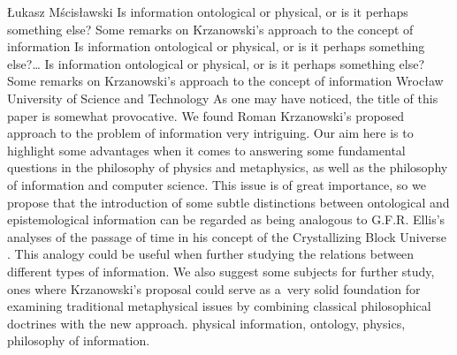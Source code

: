 \begin{artengenv}{Łukasz Mścisławski}
	{Is information ontological or physical, or is it perhaps something else? Some remarks on Krzanowski's approach to the concept of information}
	{Is information ontological or physical, or is it perhaps something else?\ldots}
	{Is information ontological or physical, or is it perhaps something else? Some remarks on Krzanowski's approach to the concept of information}
	{Wrocław University of Science and Technology}
	{As one may have noticed, the title of this paper is somewhat provocative. We found Roman Krzanowski's
	\parencites*[][]{krzanowski_does_2020}[][]{krzanowski_what_2020}[][]{krzanowski_why_2020}[][]{krzanowski_ontological_2022} %
	 proposed approach to the problem of information very intriguing. Our aim here is to highlight some advantages when it comes to answering some fundamental questions in the philosophy of physics and metaphysics, as well as the philosophy of information and computer science. This issue is of great importance, so we propose that the introduction of some subtle distinctions between ontological and epistemological information can be regarded as being analogous to G.F.R. Ellis's analyses of the passage of time in his concept of the Crystallizing Block Universe 
	\parencite[][]{ellis_space_2012}. %
	 This analogy could be useful when further studying the relations between different types of information. We also suggest some subjects for further study, ones where Krzanowski's proposal could serve as a~very solid foundation for examining traditional metaphysical issues by combining classical philosophical doctrines with the new approach.
	}
	{physical information, ontology, physics, philosophy of information.}



\end{artengenv}
